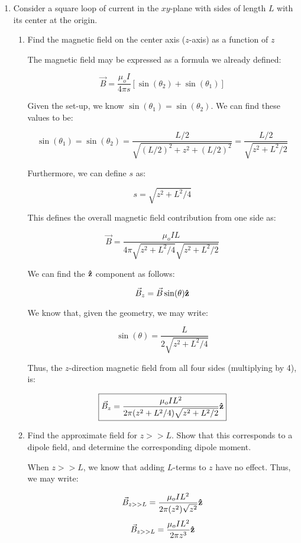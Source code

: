 \begin{enumerate}
\begin{enumerate}
    \end{enumerate}

  \item Consider a square loop of current in the $xy$-plane with sides of length $L$ with its center at the origin.

    \begin{enumerate}

      \item Find the magnetic field on the center axis ($z$-axis) as a function of $z$

        The magnetic field may be expressed as a formula we already defined:

        $$\vec{B}=\frac{\mu_oI}{4\pi s}\left[ \sin(\theta_2)+\sin(\theta_1) \right]$$

        Given the set-up, we know $\sin(\theta_1)=\sin(\theta_2)$. We can find these values to be:

        $$\sin(\theta_1)=\sin(\theta_2)=\frac{L/2}{\sqrt{\left( L/2 \right)^2+z^2+\left( L/2 \right)^2}}=\frac{L/2}{\sqrt{z^2+L^2/2}}$$

        Furthermore, we can define $s$ as:

        $$s=\sqrt{z^2+L^2/4}$$

        This defines the overall magnetic field contribution from one side as:

        $$\vec{B}=\frac{\mu_oIL}{4\pi\sqrt{z^2+L^2/4}\sqrt{z^2+L^2/2}}$$

        We can find the $\bold{\hat{z}}$ component as follows:

        $$\vec{B}_z=\vec{B}\sin(\theta)\bold{\hat{z}}$$

        We know that, given the geometry, we may write:

        $$\sin(\theta)=\frac{L}{2\sqrt{z^2+L^2/4}}$$

        Thus, the $z$-direction magnetic field from all four sides (multiplying by 4), is:

        $$\boxed{\vec{B}_z=\frac{\mu_oIL^2}{2\pi(z^2+L^2/4)\sqrt{z^2+L^2/2}}\bold{\hat{z}}}$$

      \item Find the approximate field for $z>>L$.  Show that this corresponds to a dipole field, and determine the corresponding dipole moment.

        When $z>>L$, we know that adding $L$-terms to $z$ have no effect. Thus, we may write:

        $$\vec{B}_{z>>L}=\frac{\mu_oIL^2}{2\pi(z^2)\sqrt{z^2}}\bold{\hat{z}}$$
        $$\vec{B}_{z>>L}=\frac{\mu_oIL^2}{2\pi z^3}\bold{\hat{z}}$$


\end{enumerate}
\end{enumerate}
